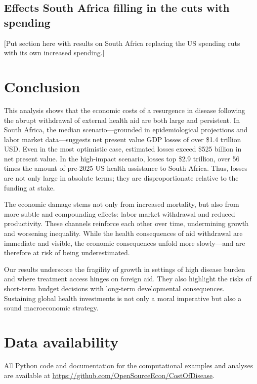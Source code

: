 \documentclass[letterpaper,12pt]{article}
\theoremstyle{definition}
\begin{document}
\begin{spacing}{1.5}
\subsection{Effects South Africa filling in the cuts with spending}\label{SecResultsSAspend}

[Put section here with results on South Africa replacing the US spending cuts with its own increased spending.]


\section{Conclusion}\label{SecConc}

This analysis shows that the economic costs of a resurgence in disease following the abrupt withdrawal of external health aid are both large and persistent. In South Africa, the median scenario—grounded in epidemiological projections and labor market data—suggests net present value GDP losses of over \$1.4 trillion USD. Even in the most optimistic case, estimated losses exceed \$525 billion in net present value. In the high-impact scenario, losses top \$2.9 trillion, over 56 times the amount of pre-2025 US health assistance to South Africa. Thus, losses are not only large in absolute terms; they are disproportionate relative to the funding at stake.

The economic damage stems not only from increased mortality, but also from more subtle and compounding effects: labor market withdrawal and reduced productivity. These channels reinforce each other over time, undermining growth and worsening inequality. While the health consequences of aid withdrawal are immediate and visible, the economic consequences unfold more slowly—and are therefore at risk of being underestimated.

Our results underscore the fragility of growth in settings of high disease burden and where treatment access hinges on foreign aid. They also highlight the risks of short-term budget decisions with long-term developmental consequences. Sustaining global health investments is not only a moral imperative but also a sound macroeconomic strategy.


\end{spacing}

\section*{Data availability}

All Python code and documentation for the computational examples and analyses are available at \href{https://github.com/OpenSourceEcon/CostOfDisease}{https://github.com/OpenSourceEcon/CostOfDisease}.

\end{document}

